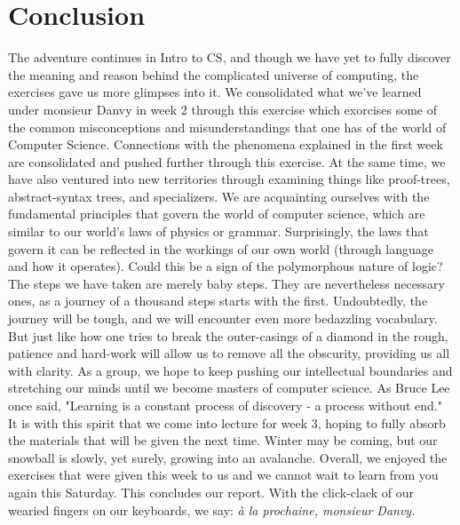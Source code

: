 \documentclass{article}
\begin{document}
\section{Conclusion}
The adventure continues in Intro to CS, and though we have yet to fully discover the meaning and reason behind the complicated universe of computing, the exercises gave us more glimpses into it. We consolidated what we've learned under monsieur Danvy in week 2 through this exercise which exorcises some of the common misconceptions and misunderstandings that one has of the world of Computer Science. Connections with the phenomena explained in the first week are consolidated and pushed further through this exercise. 
\linebreak \linebreak
At the same time, we have also ventured into new territories through examining things like proof-trees, abstract-syntax trees, and specializers. We are acquainting ourselves with the fundamental principles that govern the world of computer science, which are similar to our world's laws of physics or grammar. Surprisingly, the laws that govern it can be reflected in the workings of our own world (through language and how it operates). Could this be a sign of the polymorphous nature of logic? 
\linebreak \linebreak
The steps we have taken are merely baby steps. They are nevertheless necessary ones, as a journey of a thousand steps starts with the first. Undoubtedly, the journey will be tough, and we will encounter even more bedazzling vocabulary. But just like how one tries to break the outer-casings of a diamond in the rough, patience and hard-work will allow us to remove all the obscurity, providing us all with clarity.  
\linebreak \linebreak
As a group, we hope to keep pushing our intellectual boundaries and stretching our minds until we become masters of computer science. As Bruce Lee once said, "Learning is a constant process of discovery - a process without end." It is with this spirit that we come into lecture for week 3, hoping to fully absorb the materials that will be given the next time. Winter may be coming, but our snowball is slowly, yet surely, growing into an avalanche.
\linebreak \linebreak
Overall, we enjoyed the exercises that were given this week to us and we cannot wait to learn from you again this Saturday. This concludes our report. With the click-clack of our wearied fingers on our keyboards, we say: \textit{à la prochaine, monsieur Danvy.}

\newpage



\end{document}

